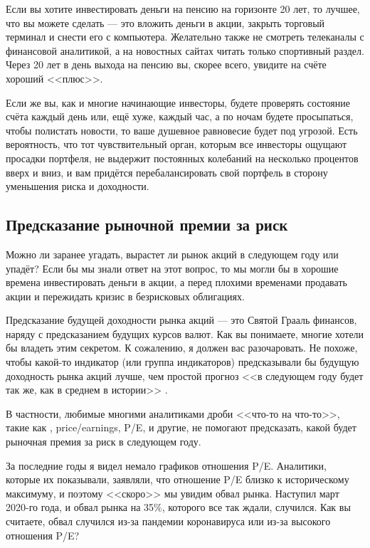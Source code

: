 Если вы хотите инвестировать деньги на пенсию на горизонте 20 лет, то лучшее, 
что вы можете сделать --- это вложить деньги в акции, закрыть торговый терминал 
и снести его с компьютера. Желательно также не смотреть телеканалы с финансовой 
аналитикой, а на новостных сайтах читать только спортивный раздел. Через 20 лет 
в день выхода на пенсию вы, скорее всего, увидите на счёте хороший <<плюс>>.

Если же вы, как и многие начинающие инвесторы, будете проверять состояние счёта 
каждый день или, ещё хуже, каждый час, а по ночам будете просыпаться, чтобы 
полистать новости, то ваше душевное равновесие будет под угрозой. Есть 
вероятность, что тот чувствительный орган, которым все инвесторы ощущают 
просадки портфеля, не выдержит постоянных колебаний на несколько процентов вверх 
и вниз, и вам придётся перебалансировать свой портфель в сторону уменьшения 
риска и доходности.

\subsection{Предсказание рыночной премии за риск}

Можно ли заранее угадать, вырастет ли рынок акций в следующем году или упадёт? 
Если бы мы знали ответ на этот вопрос, то мы могли бы в хорошие времена 
инвестировать деньги в акции, а перед плохими временами продавать акции и 
пережидать кризис в безрисковых облигациях.

Предсказание будущей доходности рынка акций --- это Святой Грааль финансов, 
наряду с предсказанием будущих курсов валют. Как вы понимаете, многие хотели бы 
владеть этим секретом. К сожалению, я должен вас разочаровать. Не похоже, чтобы 
какой-то индикатор (или группа индикаторов) предсказывали бы будущую доходность 
рынка акций лучше, чем простой прогноз <<в следующем году будет так же, как в 
среднем в истории>> \cite{welch2008comprehensive}.

В частности, любимые многими аналитиками дроби <<что-то на что-то>>, такие 
как , 
{price/earnings, P/E},  и 
другие, не помогают предсказать, какой будет рыночная премия за риск в следующем 
году. 

За последние годы я видел немало графиков отношения P/E. Аналитики, которые их 
показывали, заявляли, что отношение P/E близко к историческому максимуму, и 
поэтому <<скоро>> мы увидим обвал рынка. Наступил март 2020-го года, и обвал 
рынка на 35\%, которого все так ждали, случился. Как вы считаете, обвал случился 
из-за пандемии коронавируса или из-за высокого отношения P/E?

